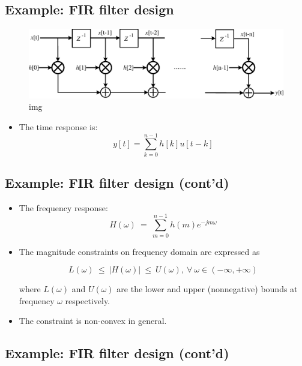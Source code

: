\documentclass[]{article}
\providecommand{\tightlist}{%
  \setlength{\itemsep}{0pt}\setlength{\parskip}{0pt}}
\begin{document}
\hypertarget{example-fir-filter-design}{%
\subsection{Example: FIR filter
design}\label{example-fir-filter-design}}

\begin{figure}
\centering
\includegraphics{ellipsoid.files/fir_strctr.pdf}
\caption{img}
\end{figure}

\begin{itemize}
\tightlist
\item
  The time response is: \[y[t] = \sum_{k=0}^{n-1}{h[k]u[t-k]}\]
\end{itemize}

\hypertarget{example-fir-filter-design-contd}{%
\subsection{Example: FIR filter design
(cont'd)}\label{example-fir-filter-design-contd}}

\begin{itemize}
\item
  The frequency response:
  \[H(\omega)~=~\sum_{m=0}^{n-1}{h(m)e^{-jm\omega}}\]
\item
  The magnitude constraints on frequency domain are expressed as

  \[L(\omega)~\leq~|H(\omega)|~\leq~U(\omega),~\forall~\omega\in(-\infty,+\infty)\]

  where \(L(\omega)\) and \(U(\omega)\) are the lower and upper
  (nonnegative) bounds at frequency \(\omega\) respectively.
\item
  The constraint is non-convex in general.
\end{itemize}

\hypertarget{example-fir-filter-design-contd-1}{%
\subsection{Example: FIR filter design
(cont'd)}\label{example-fir-filter-design-contd-1}}
\end{document}
